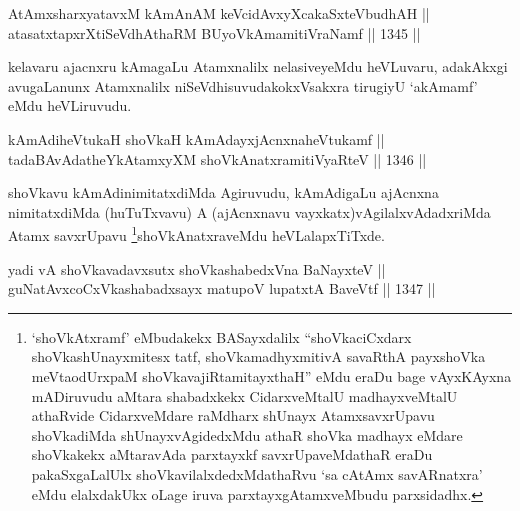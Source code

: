 
\begin{shl}
AtAmxsharxyatavxM kAmAnAM keVcidAvxyXcakaSxteV\s budhAH || \\
atasatxtapxrXtiSeVdhAthaRM BUyoV\s kAmamitiVraNamf \hfill || 1345 ||  
\end{shl}

\begin{artha}
kelavaru ajacnxru kAmagaLu Atamxnalilx nelasiveyeMdu heVLuvaru, adakAkxgi avugaLanunx Atamxnalilx niSeVdhisuvudakokxVsakxra tirugiyU `akAmamf' eMdu heVLiruvudu.
\end{artha}


\begin{shl}
kAmAdiheVtukaH shoVkaH kAmAdayxjAcnxnaheVtukamf || \\
tadaBAvAdatheYkAtamxyXM shoVkAnatxramitiVyaRteV \hfill || 1346 ||  
\end{shl}

\begin{artha}
shoVkavu kAmAdinimitatxdiMda Agiruvudu, kAmAdigaLu ajAcnxna nimitatxdiMda (huTuTxvavu) A (ajAcnxnavu vayxkatx)vAgilalxvAdadxriMda Atamx savxrUpavu \footnote{`shoVkAtxramf' eMbudakekx BASayxdalilx ``shoVkaciCxdarx shoVkashUnayxmitesx tatf, shoVkamadhyxmitivA savaRthA payxshoVka meVtaodUrxpaM shoVkavajiRtamitayxthaH'' eMdu eraDu bage vAyxKAyxna mADiruvudu aMtara shabadxkekx CidarxveMtalU madhayxveMtalU athaRvide CidarxveMdare raMdharx shUnayx AtamxsavxrUpavu shoVkadiMda shUnayxvAgidedxMdu athaR shoVka madhayx eMdare shoVkakekx aMtaravAda parxtayxkf savxrUpaveMdathaR eraDu pakaSxgaLalUlx shoVkavilalxdedxMdathaRvu `sa cAtAmx savARnatxra' eMdu elalxdakUkx oLage iruva parxtayxgAtamxveMbudu parxsidadhx.}shoVkAnatxraveMdu heVLalapxTiTxde.
\end{artha}


\begin{shl}
yadi vA \footnotemark[2]shoVkavadavxsutx shoVkashabedxVna BaNayxteV || \\
guNatAvxcoCxVkashabadxsayx matupoV lupatxtA BaveVtf \hfill || 1347 ||  
\end{shl}

